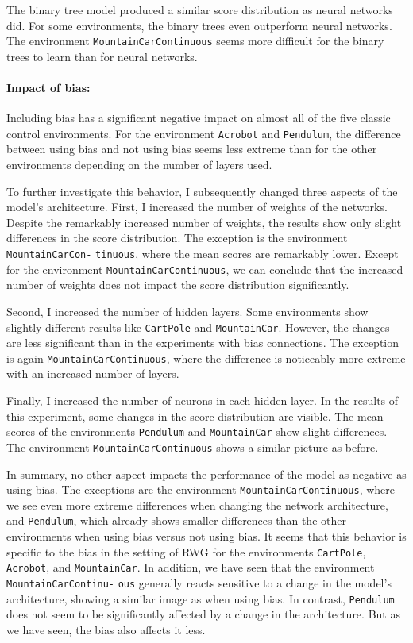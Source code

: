 The binary tree model produced a similar score distribution as neural networks did. For some environments, the binary trees even outperform neural networks. The environment \verb|MountainCarContinuous| seems more difficult for the binary trees to learn than for neural networks.

\paragraph*{Impact of bias:} Including bias has a significant negative impact on almost all of the five classic control environments. For the environment \verb|Acrobot| and \verb|Pendulum|, the difference between using bias and not using bias seems less extreme than for the other environments depending on the number of layers used.

To further investigate this behavior, I subsequently changed three aspects of the model's architecture. First, I increased the number of weights of the networks. Despite the remarkably increased number of weights, the results show only slight differences in the score distribution. The exception is the environment \texttt{MountainCarCon-} \texttt{tinuous}, where the mean scores are remarkably lower. Except for the environment \texttt{MountainCarContinuous}, we can conclude that the increased number of weights does not impact the score distribution significantly.

Second, I increased the number of hidden layers. Some environments show slightly different results like \verb|CartPole| and \verb|MountainCar|. However, the changes are less significant than in the experiments with bias connections. The exception is again \verb|MountainCarContinuous|, where the difference is noticeably more extreme with an increased number of layers.

Finally, I increased the number of neurons in each hidden layer. In the results of this experiment, some changes in the score distribution are visible. The mean scores of the environments \verb|Pendulum| and \verb|MountainCar| show slight differences. The environment \verb|MountainCarContinuous| shows a similar picture as before.

In summary, no other aspect impacts the performance of the model as negative as using bias. The exceptions are the environment \verb|MountainCarContinuous|, where we see even more extreme differences when changing the network architecture, and \verb|Pendulum|, which already shows smaller differences than the other environments when using bias versus not using bias. It seems that this behavior is specific to the bias in the setting of RWG for the environments \verb|CartPole|, \verb|Acrobot|, and \verb|MountainCar|. In addition, we have seen that the environment \verb|MountainCarContinu-| \verb|ous| generally reacts sensitive to a change in the model's architecture, showing a similar image as when using bias. In contrast, \verb|Pendulum| does not seem to be significantly affected by a change in the architecture. But as we have seen, the bias also affects it less.
